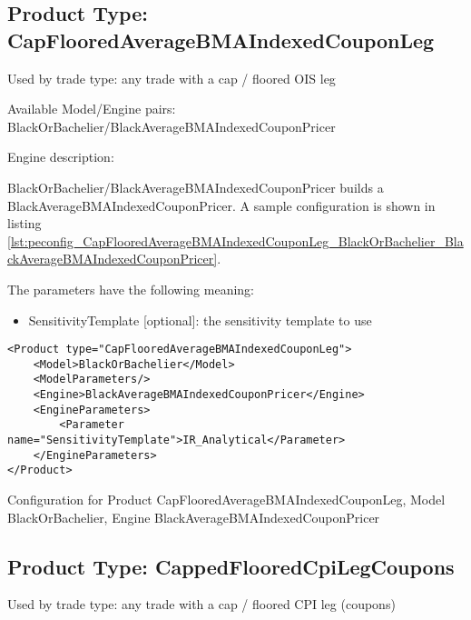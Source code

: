 \subsection{Product Type: CapFlooredAverageBMAIndexedCouponLeg}

Used by trade type: any trade with a cap / floored OIS leg

Available Model/Engine pairs: BlackOrBachelier/BlackAverageBMAIndexedCouponPricer

Engine description:

BlackOrBachelier/BlackAverageBMAIndexedCouponPricer builds a BlackAverageBMAIndexedCouponPricer. A sample configuration is
shown in listing \ref{lst:peconfig_CapFlooredAverageBMAIndexedCouponLeg_BlackOrBachelier_BlackAverageBMAIndexedCouponPricer}.

The parameters have the following meaning:

\begin{itemize}
\item SensitivityTemplate [optional]: the sensitivity template to use 
\end{itemize}

\begin{longlisting}
\begin{verbatim}
<Product type="CapFlooredAverageBMAIndexedCouponLeg">
    <Model>BlackOrBachelier</Model>
    <ModelParameters/>
    <Engine>BlackAverageBMAIndexedCouponPricer</Engine>
    <EngineParameters>
        <Parameter name="SensitivityTemplate">IR_Analytical</Parameter>
    </EngineParameters>
</Product>
\end{verbatim}
\caption{Configuration for Product CapFlooredAverageBMAIndexedCouponLeg, Model BlackOrBachelier, Engine BlackAverageBMAIndexedCouponPricer}
\label{lst:peconfig_CapFlooredAverageBMAIndexedCouponLeg_BlackOrBachelier_BlackAverageBMAIndexedCouponPricer}
\end{longlisting}

\subsection{Product Type: CappedFlooredCpiLegCoupons}

Used by trade type: any trade with a cap / floored CPI leg (coupons)

